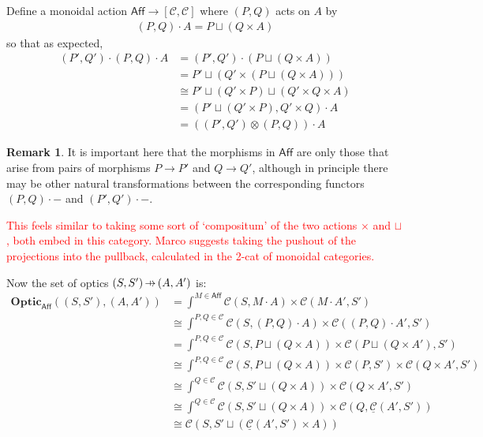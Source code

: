 \documentclass[11pt,a4paper]{article}
\theoremstyle{plain}
\theoremstyle{definition}
\newtheorem{remark}[theorem]{Remark}
\newcommand{\C}{\mathscr{C}}
\newcommand{\homC}{\underline{\C}}
\newcommand{\Optic}{\mathbf{Optic}}
\newcommand{\hto}{\ensuremath{\,\mathaccent\shortmid\rightarrow\,}}
\newcommand{\todo}[1]{\textcolor{red}{\small #1}}
\begin{document}
Define a monoidal action $\mathsf{Aff} \to [\C, \C]$ where $(P, Q)$ acts on $A$ by
\begin{align*}
  (P, Q) \cdot A = P \sqcup (Q \times A)
\end{align*}
so that as expected,
\begin{align*}
  (P', Q') \cdot (P, Q) \cdot A
  &= (P', Q') \cdot  (P \sqcup (Q \times A)) \\
  &= P' \sqcup (Q' \times (P \sqcup (Q \times A))) \\
  &\cong P' \sqcup (Q' \times P) \sqcup (Q' \times Q \times A) \\
  &= (P' \sqcup (Q' \times P) , Q' \times Q) \cdot A \\
  &= ((P', Q') \otimes (P, Q)) \cdot A
\end{align*}

\begin{remark}
  It is important here that the morphisms in $\mathsf{Aff}$ are only those that arise from pairs of morphisms $P \to P'$ and $Q \to Q'$, although in principle there may be other natural transformations between the corresponding functors $(P, Q) \cdot -$ and $(P', Q') \cdot -$.
\end{remark}

\todo{This feels similar to taking some sort of `compositum' of the two actions $\times$ and $\sqcup$, both embed in this category. Marco suggests taking the pushout of the projections into the pullback, calculated in the 2-cat of monoidal categories.}

Now the set of optics $(S, S') \hto (A, A')$ is:
\begin{align*}
  \Optic_{\mathsf{Aff}}((S, S'), (A, A'))
  &= \int^{M \in \mathsf{Aff}} \C(S, M \cdot A) \times \C(M \cdot A', S') \\
  &\cong \int^{P,Q \in \C} \C(S, (P,Q) \cdot A) \times \C((P,Q) \cdot A', S') \\
  &= \int^{P,Q \in \C} \C(S, P \sqcup (Q \times A)) \times \C(P \sqcup (Q \times A'), S') \\
  &\cong \int^{P,Q \in \C} \C(S, P \sqcup (Q \times A)) \times \C(P,S') \times \C(Q \times A', S') \\
  &\cong \int^{Q \in \C} \C(S, S' \sqcup (Q \times A)) \times \C(Q \times A', S') \\
  &\cong \int^{Q \in \C} \C(S, S' \sqcup (Q \times A)) \times \C(Q, \homC(A', S')) \\
  &\cong \C(S, S' \sqcup (\homC(A', S') \times A))
\end{align*}
\end{document}
